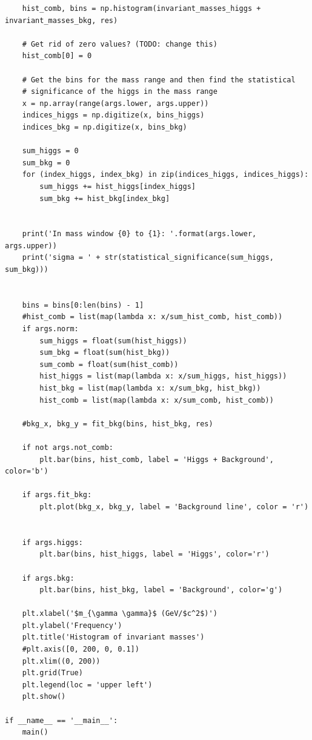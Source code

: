 \documentclass{article}
\begin{document}
\begin{lstlisting}
    hist_comb, bins = np.histogram(invariant_masses_higgs + invariant_masses_bkg, res)

    # Get rid of zero values? (TODO: change this)
    hist_comb[0] = 0

    # Get the bins for the mass range and then find the statistical
    # significance of the higgs in the mass range
    x = np.array(range(args.lower, args.upper))
    indices_higgs = np.digitize(x, bins_higgs)
    indices_bkg = np.digitize(x, bins_bkg)

    sum_higgs = 0
    sum_bkg = 0
    for (index_higgs, index_bkg) in zip(indices_higgs, indices_higgs):
        sum_higgs += hist_higgs[index_higgs]
        sum_bkg += hist_bkg[index_bkg]


    print('In mass window {0} to {1}: '.format(args.lower, args.upper))
    print('sigma = ' + str(statistical_significance(sum_higgs, sum_bkg)))


    bins = bins[0:len(bins) - 1]
    #hist_comb = list(map(lambda x: x/sum_hist_comb, hist_comb))
    if args.norm:
        sum_higgs = float(sum(hist_higgs))
        sum_bkg = float(sum(hist_bkg))
        sum_comb = float(sum(hist_comb))
        hist_higgs = list(map(lambda x: x/sum_higgs, hist_higgs))
        hist_bkg = list(map(lambda x: x/sum_bkg, hist_bkg))
        hist_comb = list(map(lambda x: x/sum_comb, hist_comb))

    #bkg_x, bkg_y = fit_bkg(bins, hist_bkg, res)

    if not args.not_comb:
        plt.bar(bins, hist_comb, label = 'Higgs + Background', color='b')

    if args.fit_bkg:
        plt.plot(bkg_x, bkg_y, label = 'Background line', color = 'r')


    if args.higgs:
        plt.bar(bins, hist_higgs, label = 'Higgs', color='r')

    if args.bkg:
        plt.bar(bins, hist_bkg, label = 'Background', color='g')

    plt.xlabel('$m_{\gamma \gamma}$ (GeV/$c^2$)')
    plt.ylabel('Frequency')
    plt.title('Histogram of invariant masses')
    #plt.axis([0, 200, 0, 0.1])
    plt.xlim((0, 200))
    plt.grid(True)
    plt.legend(loc = 'upper left')
    plt.show()

if __name__ == '__main__':
    main()

\end{lstlisting}
\end{document}
